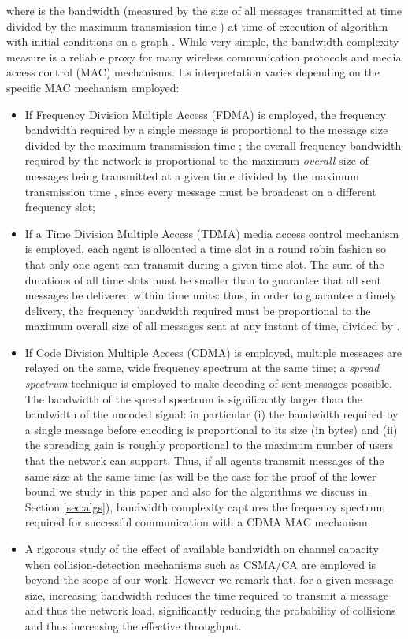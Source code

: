 \documentclass[letterpaper,10pt,conference]{ieeeconf}
\begin{document}
where  is the bandwidth (measured by the size of all messages transmitted at time  divided by the maximum transmission time ) at time  of execution  of algorithm  with initial conditions  on a graph .
While very simple, the bandwidth complexity measure is a reliable proxy for many wireless communication protocols and media access control (MAC) mechanisms. Its interpretation varies depending on the specific MAC mechanism employed:
\begin{itemize}
\item If Frequency Division Multiple Access (FDMA) is employed, the frequency bandwidth required by a single message is proportional to the message size divided by the maximum transmission time ; the overall frequency bandwidth required by the network is proportional to the maximum \emph{overall} size of messages being transmitted at a given time divided by the maximum transmission time , since every message must be broadcast on a different frequency slot;
\item If a Time Division Multiple Access (TDMA) media access control mechanism is employed, each agent is allocated a time slot in a round robin fashion so that only one agent can transmit during a given time slot. The sum of the durations of all time slots must be smaller than  to guarantee that all sent messages be delivered within  time units: thus, in order to guarantee a timely delivery, the frequency bandwidth required must be proportional to the maximum overall size of all messages sent at any instant of time, divided by .
\item If Code Division Multiple Access (CDMA) is employed, multiple messages are relayed on the same, wide frequency spectrum at the same time; a \emph{spread spectrum} technique is employed to make decoding of sent messages possible. The bandwidth of the spread spectrum is significantly larger than the bandwidth of the uncoded signal: in particular (i) the bandwidth required by a single message before encoding is proportional to its size (in bytes) and (ii) the spreading gain is roughly proportional to the maximum number of users that the network can support. Thus, if all agents transmit messages of the same size at the same time (as will be the case for the proof of the lower bound we study in this paper and also for the algorithms we discuss in Section \ref{sec:algs}), bandwidth complexity captures the frequency spectrum required for successful communication with a CDMA MAC mechanism.

\item A rigorous study of the effect of available bandwidth on channel capacity when collision-detection mechanisms such as CSMA/CA are employed is beyond the scope of our work. However we remark that, for a given message size, increasing bandwidth reduces the time required to transmit a message and thus the network load, significantly reducing the probability of collisions and thus increasing the effective throughput.
\end{itemize}
\end{document}
